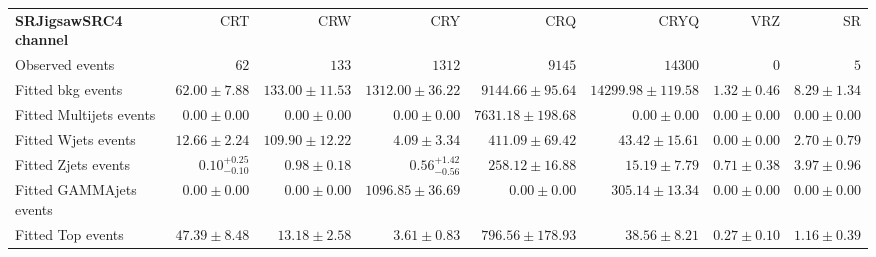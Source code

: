 

\begin{table}
\begin{center}
\setlength{\tabcolsep}{0.0pc}
{\tiny
\begin{tabular*}{\textwidth}{@{\extracolsep{\fill}}lrrrrrrr}
\noalign{\smallskip}\hline\noalign{\smallskip}
{\bf SRJigsawSRC4 channel}           & CRT            & CRW            & CRY            & CRQ            & CRYQ            & VRZ            & SR              \\[-0.05cm]
\noalign{\smallskip}\hline\noalign{\smallskip}
Observed events          & $62$              & $133$              & $1312$              & $9145$              & $14300$              & $0$              & $5$                    \\
\noalign{\smallskip}\hline\noalign{\smallskip}
Fitted bkg events         & $62.00 \pm 7.88$          & $133.00 \pm 11.53$          & $1312.00 \pm 36.22$          & $9144.66 \pm 95.64$          & $14299.98 \pm 119.58$          & $1.32 \pm 0.46$          & $8.29 \pm 1.34$              \\
\noalign{\smallskip}\hline\noalign{\smallskip}
        Fitted Multijets events         & $0.00 \pm 0.00$          & $0.00 \pm 0.00$          & $0.00 \pm 0.00$          & $7631.18 \pm 198.68$          & $0.00 \pm 0.00$          & $0.00 \pm 0.00$          & $0.00 \pm 0.00$              \\
        Fitted Wjets events         & $12.66 \pm 2.24$          & $109.90 \pm 12.22$          & $4.09 \pm 3.34$          & $411.09 \pm 69.42$          & $43.42 \pm 15.61$          & $0.00 \pm 0.00$          & $2.70 \pm 0.79$              \\
        Fitted Zjets events         & $0.10_{-0.10}^{+0.25}$          & $0.98 \pm 0.18$          & $0.56_{-0.56}^{+1.42}$          & $258.12 \pm 16.88$          & $15.19 \pm 7.79$          & $0.71 \pm 0.38$          & $3.97 \pm 0.96$              \\
        Fitted GAMMAjets events         & $0.00 \pm 0.00$          & $0.00 \pm 0.00$          & $1096.85 \pm 36.69$          & $0.00 \pm 0.00$          & $305.14 \pm 13.34$          & $0.00 \pm 0.00$          & $0.00 \pm 0.00$              \\
        Fitted Top events         & $47.39 \pm 8.48$          & $13.18 \pm 2.58$          & $3.61 \pm 0.83$          & $796.56 \pm 178.93$          & $38.56 \pm 8.21$          & $0.27 \pm 0.10$          & $1.16 \pm 0.39$              \\

\end{tabular*}}
\end{center}
\end{table}
